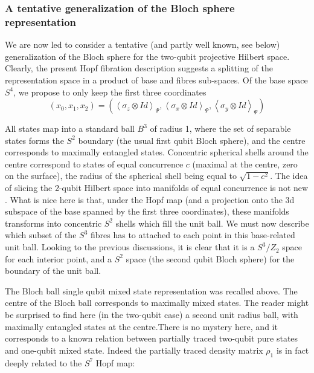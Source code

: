 \documentclass{amsart}
\begin{document}
\subsubsection{A tentative generalization of the Bloch sphere representation}

We are now led to consider a tentative (and partly well known, see below)
generalization of the Bloch sphere for the two-qubit projective Hilbert space.
Clearly, the present Hopf fibration description suggests a splitting of the
representation space in a product of base and fibres sub-spaces. Of the base
space $S^{4}$, we propose to only keep the first three coordinates
\begin{equation}
\left(  x_{0},x_{1},x_{2}\right)  =\left(  \left\langle \sigma_{z}\otimes
Id\right\rangle _{\Psi},\left\langle \sigma_{x}\otimes Id\right\rangle _{\Psi
},\left\langle \sigma_{y}\otimes Id\right\rangle _{\Psi}\right)
\end{equation}

All states map into a standard ball $B^{3}$ of radius 1, where the set of
separable states forms the $S^{2}$ boundary (the usual first qubit Bloch
sphere), and the centre corresponds to maximally entangled states. Concentric
spherical shells around the centre correspond to states of equal concurrence
$c$ (maximal at the centre, zero on the surface), the radius of the spherical
shell being equal to $\sqrt{1-c^{2}}$. The idea of slicing the 2-qubit Hilbert
space into manifolds of equal concurrence is not new \cite{2qbits_geometry}.
What is nice here is that, under the Hopf map (and a projection onto the 3d
subspace of the base spanned by the first three coordinates), these manifolds
transforms into concentric $S^{2}$ shells which fill the unit ball. We must
now describe which subset of the $S^{3}$ fibres has to attached to each point
in this base-related unit ball. Looking to the previous discussions, it is
clear that it is a $S^{3}/Z_{2}$ space for each interior point, and a $S^{2}$
space (the second qubit Bloch sphere) for the boundary of the unit ball.

The Bloch ball single qubit mixed state representation was recalled above. The
centre of the Bloch ball corresponds to maximally mixed states. The reader
might be surprised to find here (in the two-qubit case) a second unit radius
ball, with maximally entangled states at the centre.There is no mystery here,
and it corresponds to a known relation between partially traced two-qubit pure
states and one-qubit mixed state. Indeed the partially traced density matrix
$\rho_{1}$ is in fact deeply related to the $S^{7}$ Hopf map:%
\end{document}

